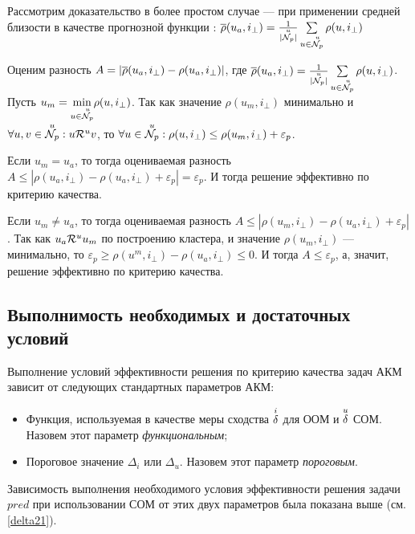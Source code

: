 Рассмотрим доказательство в более простом случае ---
при применении средней близости в качестве прогнозной функции
\cite{rs-handbook}:
$\overline{\rho}(u_a,i_{\bot}) = \frac{1}{|{\overset{u}{\mathcal{N}_p}}|} \sum
\limits_{u \in {\overset{u}{\mathcal{N}_p}}} \rho(u,i_{\bot})$

Оценим разность $A = |\overline{\rho}(u_a, i_{\bot}) - \rho(u_a, i_{\bot})|$, где
$\overline{\rho}(u_a, i_{\bot}) = \frac{1}{|{\overset{u}{\mathcal{N}_p}}|} \sum
\limits_{u \in {\overset{u}{\mathcal{N}_p}}} \rho(u,i_{\bot})$.
Пусть $u_m = \underset{u \in {\overset{u}{\mathcal{N}_p}}} \min {\rho(u, i_{\bot})}$. Так как значение $\rho(u_m, i_{\bot})$ минимально
и $\forall u,v \in {\overset{u}{\mathcal{N}_p}}: u \mathcal{R}^u v$,
то $\forall u \in {\overset{u}{\mathcal{N}_p}}: \rho(u, i_{\bot}) \le \rho(u_m, i_{\bot}) +
\varepsilon_p$.

Если $u_m = u_a$, то тогда оцениваемая разность
$A \le |\rho(u_a,i_{\bot}) - \rho(u_a, i_{\bot}) + \varepsilon_p| = \varepsilon_p$. И
тогда решение эффективно по критерию качества.

Если $u_m \ne u_a$, то тогда оцениваемая разность
$A \le |\rho(u_m,i_{\bot}) - \rho(u_a, i_{\bot}) + \varepsilon_p|$. Так как
$u_a \mathcal{R}^u u_m$ по построению кластера, и значение $\rho(u_m,i_{\bot})$ --- минимально, то
$\varepsilon_p \ge \rho(u^m,i_{\bot}) - \rho(u_a, i_{\bot}) \le 0$. И тогда $A \le
\varepsilon_p$, а, значит, решение эффективно по критерию качества.


\subsection{Выполнимость необходимых и достаточных условий}
Выполнение условий эффективности решения по критерию качества
задач АКМ зависит от следующих
стандартных параметров АКМ:
\begin{itemize}
\label{krt-params}
\item Функция, используемая в качестве меры сходства ${\overset{i}{\mathcal{\delta}}}$ для ООМ и ${\overset{u}{\mathcal{\delta}}}$ СОМ.
	Назовем этот параметр {\it функциональным};
\item Пороговое значение $\Delta_i$ или $\Delta_u$.
	Назовем этот параметр {\it пороговым}.
\end{itemize}

Зависимость выполнения необходимого условия эффективности решения задачи
$pred$ при использовании СОМ от этих двух параметров была
показана выше (см. \ref{delta21}).


